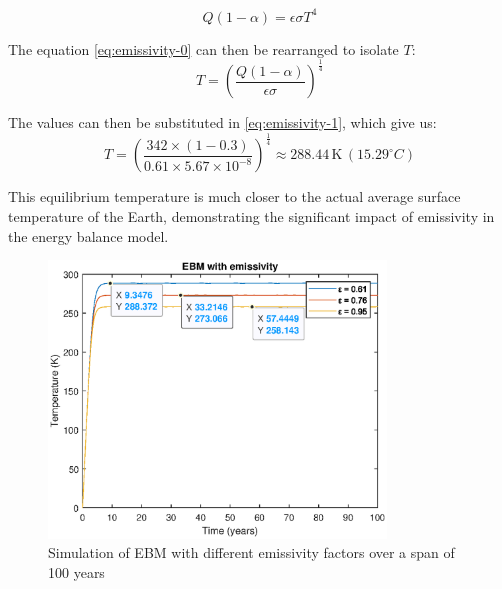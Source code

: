 \documentclass[12pt]{article}
\begin{document}
\begin{equation} \label{eq:emissivity-0}
    Q(1 - \alpha) = \epsilon\sigma T^4
\end{equation}

\noindent The equation \ref{eq:emissivity-0} can then be rearranged to isolate $T$:
\begin{equation} \label{eq:emissivity-1}
    T = \left( \frac{Q(1 - \alpha)}{\epsilon\sigma} \right)^{\frac{1}{4}}
\end{equation}

\noindent The values can then be substituted in \ref{eq:emissivity-1}, which give us:
\begin{equation}
    T = \left( \frac{342 \times (1 - 0.3)}{0.61 \times 5.67 \times 10^{-8}} \right)^{\frac{1}{4}} \approx 288.44 \, \text{K} \, ({15.29}^\circ C)
\end{equation}


This equilibrium temperature is much closer to the actual average surface temperature of the Earth, demonstrating the significant impact of emissivity 
in the energy balance model.

\begin{figure}[H]
    \centering
    \includegraphics[width=0.8\textwidth]{images/ebm_emissivity_diff.eps}
    \caption{Simulation of EBM with different emissivity factors over a span of 100 years}

    \label{fig:ebm_emissivity}
\end{figure}
\end{document}
